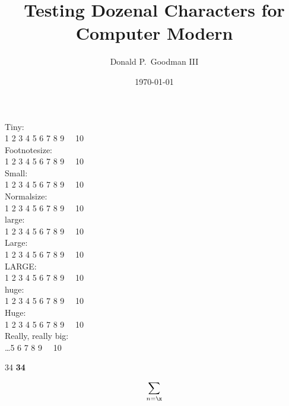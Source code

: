 \documentclass{article}
\title{Testing Dozenal Characters for Computer Modern}
\author{Donald P.\ Goodman III}
\date{\today}
\begin{document}
\maketitle

\noindent
Tiny: \\
\tiny 1 2 3 4 5 6 7 8 9 \x\ \e\ 10 \\\normalsize
Footnotesize: \\
\footnotesize 1 2 3 4 5 6 7 8 9 \x\ \e\ 10 \\\normalsize
Small: \\
\small 1 2 3 4 5 6 7 8 9 \x\ \e\ 10 \\\normalsize
Normalsize: \\
\normalsize 1 2 3 4 5 6 7 8 9 \x\ \e\ 10 \\\normalsize
large: \\
\large 1 2 3 4 5 6 7 8 9 \x\ \e\ 10 \\\normalsize
Large: \\
\Large 1 2 3 4 5 6 7 8 9 \x\ \e\ 10 \\\normalsize
LARGE: \\
\LARGE 1 2 3 4 5 6 7 8 9 \x\ \e\ 10 \\\normalsize
huge: \\
\huge 1 2 3 4 5 6 7 8 9 \x\ \e\ 10 \\\normalsize
Huge: \\
\Huge 1 2 3 4 5 6 7 8 9 \x\ \e\ 10 \\\normalsize
Really, really big:  \\
\fontsize{50pt}{65pt}\selectfont\ldots 5 6 7 8 9 \x\ \e\
10 \\\normalsize

34
\textbf{34\x5897}

\begin{equation}
\sum_{n = \x}
\end{equation}

\clearpage
\end{document}
